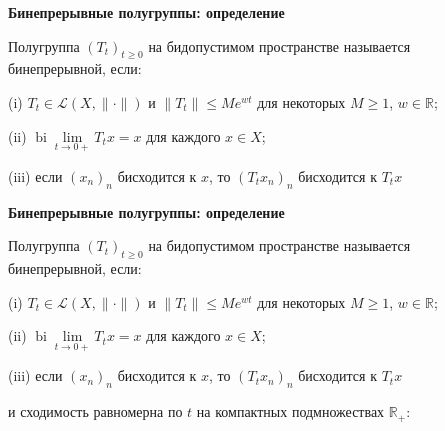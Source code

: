 \documentclass[11pt]{article}
\newcommand{\R}{\mathbb{R}}
\begin{document}
\begin{center}
{\color{notaeYELLOW}\bfseries\fontsize{44}{52}\selectfont Бинепрерывные полугруппы: определение}
\end{center}
\vspace*{\fill}
\begin{center}
\fontsize{36}{43}\selectfont
\parbox{\linewidth}{\centering\noindent Полугруппа $(T_t)_{t\ge0}$ на бидопустимом пространстве называется бинепрерывной, если:
\par}\vspace{0.4in}
\parbox{\linewidth}{\centering\noindent (i) $T_t\in\mathcal{L}(X,\|\cdot\|)$ и $\|T_t\|\le Me^{wt}$ для некоторых $M\ge1$, $w\in\R$;
\par}\vspace{0.4in}
\parbox{\linewidth}{\centering\noindent (ii) $\operatorname{bi}\lim\limits_{t\to0+}T_t x=x$ для каждого $x\in X$;
\par}\vspace{0.4in}
\parbox{\linewidth}{\centering\noindent (iii) если $(x_n)_n$ бисходится к $x$, то $(T_t x_n)_n$ бисходится к $T_t x$
\par}\vspace{0.4in}
\end{center}
\vspace*{\fill}

\newpage

\begin{center}
{\color{notaeYELLOW}\bfseries\fontsize{44}{52}\selectfont Бинепрерывные полугруппы: определение}
\end{center}
\vspace*{\fill}
\begin{center}
\fontsize{36}{43}\selectfont
\parbox{\linewidth}{\centering\noindent Полугруппа $(T_t)_{t\ge0}$ на бидопустимом пространстве называется бинепрерывной, если:
\par}\vspace{0.4in}
\parbox{\linewidth}{\centering\noindent (i) $T_t\in\mathcal{L}(X,\|\cdot\|)$ и $\|T_t\|\le Me^{wt}$ для некоторых $M\ge1$, $w\in\R$;
\par}\vspace{0.4in}
\parbox{\linewidth}{\centering\noindent (ii) $\operatorname{bi}\lim\limits_{t\to0+}T_t x=x$ для каждого $x\in X$;
\par}\vspace{0.4in}
\parbox{\linewidth}{\centering\noindent (iii) если $(x_n)_n$ бисходится к $x$, то $(T_t x_n)_n$ бисходится к $T_t x$
\par}\vspace{0.4in}
\parbox{\linewidth}{\centering\noindent и сходимость равномерна по $t$ на компактных подмножествах $\R_+$:
\par}\vspace{0.4in}
\end{center}
\vspace*{\fill}
\end{document}
